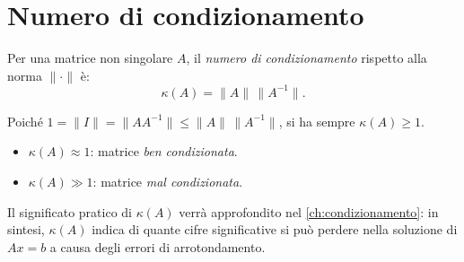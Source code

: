 \section{Numero di condizionamento}
\label{sec:condizionamento_mat}

\begin{definition}
Per una matrice non singolare $A$, il \emph{numero di condizionamento} rispetto alla
norma $\|\cdot\|$ è:
\begin{equation}
  \kappa(A) = \|A\|\,\|A^{-1}\|.
  \label{eq:cond}
\end{equation}
\end{definition}

\begin{remark}
Poiché $1 = \|I\| = \|AA^{-1}\| \leq \|A\|\,\|A^{-1}\|$, si ha sempre
$\kappa(A) \geq 1$.
\begin{itemize}
  \item $\kappa(A) \approx 1$: matrice \emph{ben condizionata}.
  \item $\kappa(A) \gg 1$: matrice \emph{mal condizionata}.
\end{itemize}
\end{remark}

Il significato pratico di $\kappa(A)$ verrà approfondito nel
\cref{ch:condizionamento}: in sintesi, $\kappa(A)$ indica di quante cifre
significative si può perdere nella soluzione di $Ax = b$ a causa degli errori di
arrotondamento.
